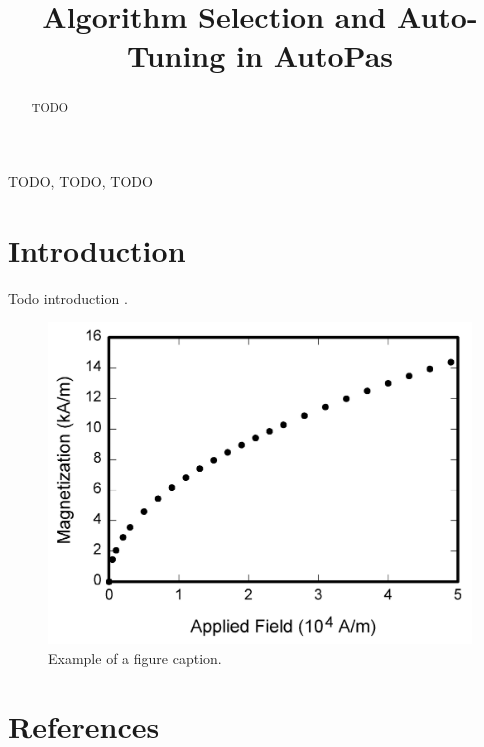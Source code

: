 \documentclass[conference]{IEEEtran}
\begin{document}
\title{Algorithm Selection and Auto-Tuning in AutoPas}

\author{
}

\maketitle

\begin{abstract}
    TODO
\end{abstract}

\begin{IEEEkeywords}
    TODO, TODO, TODO
\end{IEEEkeywords}


\section{Introduction}
Todo introduction \cite{test}.

\begin{figure}[htbp]
    \centerline{\includegraphics{figures/fig1.png}}
    \caption{Example of a figure caption.}
    \label{fig}
\end{figure}


\section*{References}



\end{document}
